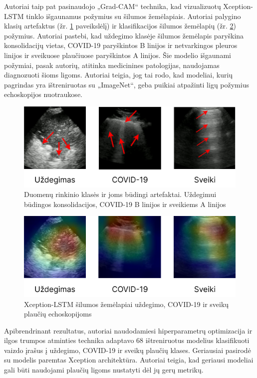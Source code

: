 \documentclass[fleqn]{VUMIFKompMagistrinis}
\begin{document}
Autoriai taip pat pasinaudojo „Grad-CAM“ technika, kad vizualizuotų Xception-LSTM tinklo išgaunamus požymius su šilumos žemėlapiais. Autoriai palygino klasių artefaktus (žr. \ref{img:plauciai_LSTM} paveikslėlį) ir klasifikacijos šilumos žemėlapių (žr. \ref{img:plauciai_grad}) požymius. Autoriai pastebi, kad uždegimo klasėje šilumos žemėlapis paryškina konsolidacijų vietas, COVID-19 paryškintos B linijos ir netvarkingos pleuros linijos ir sveikuose plaučiuose paryškintos A linijos. Šie modelio išgaunami požymiai, pasak autorių, atitinka medicinines patologijas, naudojamas diagnozuoti šioms ligoms. Autoriai teigia, jog tai rodo, kad modeliai, kurių pagrindas yra ištreniruotas su „ImageNet“, geba puikiai atpažinti ligų požymius echoskopijos nuotraukose.
\begin{figure}[H]
    \centering
    \includegraphics[scale=0.5]{img/Plausiai_ltsm.png}
    \caption{Duomenų rinkinio klasės ir joms būdingi artefaktai. Uždegimui būdingos konsolidacijos, COVID-19 B linijos ir sveikiems A linijos \cite{LSTM}}
    \label{img:plauciai_LSTM}
\end{figure}
\begin{figure}[H]
    \centering
    \includegraphics[scale=0.5]{img/plauciai_grad.png}
    \caption{Xception-LSTM šilumos žemėlapiai uždegimo, COVID-19 ir sveikų plaučių echoskopijoms \cite{LSTM}}
    \label{img:plauciai_grad}
\end{figure}

Apibrendrinant rezultatus, autoriai naudodamiesi hiperparametrų optimizacija ir ilgos trumpos atminties technika adaptavo 68 ištreniruotus modelius klasifikuoti vaizdo įrašus į uždegimo, COVID-19 ir sveikų plaučių klases. Geriausiai pasirodė su modelis paremtas Xception architektūra. Autoriai teigia, kad geriausi modeliai gali būti naudojami plaučių ligoms nustatyti dėl jų gerų metrikų.
\end{document}
